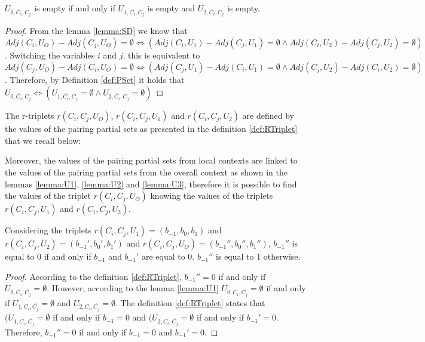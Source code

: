 \begin{lemma}\label{lemma:U3}
$U_{0,\overbar{C_{i}},C_{j}}$ is empty if and only if $U_{1,\overbar{C_{i}},C_{j}}$ is empty and $U_{2,\overbar{C_{i}},C_{j}}$ is empty.
\end{lemma}

\begin{proof}
From the lemma \ref{lemma:SD} we know that $Adj(C_{i}, U_{O}) - Adj(C_{j}, U_{O}) = \emptyset  \Leftrightarrow (Adj(C_{i}, U_{1}) - Adj(C_{j}, U_{1}) = \emptyset \wedge Adj(C_{i}, U_{2}) - Adj(C_{j}, U_{2}) = \emptyset)$. Switching the variables $i$ and $j$, this is equivalent to $Adj(C_{j}, U_{O}) - Adj(C_{i}, U_{O}) = \emptyset  \Leftrightarrow (Adj(C_{j}, U_{1}) - Adj(C_{i}, U_{1}) = \emptyset \wedge Adj(C_{j}, U_{2}) - Adj(C_{i}, U_{2}) = \emptyset)$. Therefore, by Definition \ref{def:PSet} it holds that $U_{0,\overbar{C_i},C_j} \Leftrightarrow  (U_{1,\overbar{C_i},C_j} = \emptyset \wedge U_{2,\overbar{C_i},C_j} = \emptyset)$
\end{proof}

The r-triplets $r(C_{i}, C_{j}, U_{O})$, $r(C_{i}, C_{j}, U_{1})$ and $r(C_{i},C_{j},U_{2})$ are defined by the values of the pairing partial sets as presented in the definition \ref{def:RTriplet} that we recall below:

\rTriplet* 

Moreover, the values of the pairing partial sets from local contexts are linked to the values of the pairing partial sets from the overall context as shown in the lemmas \ref{lemma:U1}, \ref{lemma:U2} and \ref{lemma:U3}, therefore it is possible to find the values of the triplet $r(C_{i}, C_{j}, U_{O})$ knowing the values of the triplets $r(C_{i}, C_{j}, U_{1})$ and $r(C_{i},C_{j},U_{2})$.

\begin{lemma}\label{lemma:b-1}
Considering the triplets $r(C_{i},C_{j},U_{1}) = (b_{-1}, b_{0}, b_{1})$ and $r(C_{i},C_{j},U_{2}) = (b_{-1}', b_{0}', b_{1}')$ and $r(C_{i}, C_{j}, U_{O}) = (b_{-1}'', b_{0}'', b_{1}'')$, $b_{-1}''$ is equal to 0 if and only if $b_{-1}$ and $b_{-1}'$ are equal to 0. $b_{-1}''$ is equal to 1 otherwise.
\end{lemma}

\begin{proof}
According to the definition \ref{def:RTriplet}, $b_{-1}'' = 0$ if and only if $U_{0,C_i,\overbar{C_j}} = \emptyset$. However, according to the lemma \ref{lemma:U1} $U_{0,C_i,\overbar{C_j}} = \emptyset$ if and only if $U_{1,C_i,\overbar{C_j}} = \emptyset$ and $U_{2,C_i,\overbar{C_j}} = \emptyset$. The definition \ref{def:RTriplet} states that $(U_{1,C_i,\overbar{C_j}} = \emptyset$ if and only if $b_{-1} = 0$ and $(U_{2,C_i,\overbar{C_j}} = \emptyset$ if and only if $b_{-1}' = 0$. Therefore, $b_{-1}'' = 0$ if and only if $b_{-1} = 0$ and $b_{-1}' = 0$.
\end{proof}

